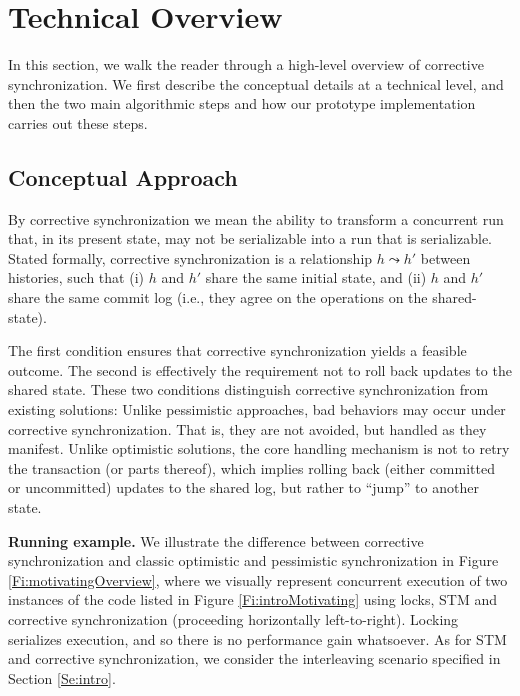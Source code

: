 \section{Technical Overview}

In this section, we walk the reader through a high-level overview of corrective synchronization. We first describe the conceptual details at a technical level, and then the two main algorithmic steps and how our prototype implementation carries out these steps.

\subsection{Conceptual Approach}

By corrective synchronization we mean the ability to transform a concurrent run that, in its present state, may not be serializable into a run that is serializable. Stated formally, corrective synchronization is a relationship $h \leadsto h'$ between histories, such that (i) $h$ and $h'$ share the same initial state, and (ii) $h$ and $h'$ share the same commit log (i.e., they agree on the operations on the shared-state).

The first condition ensures that corrective synchronization yields a feasible outcome. The second is effectively the requirement not to roll back updates to the shared state. These two conditions distinguish corrective synchronization from existing solutions: Unlike pessimistic approaches, bad behaviors may occur under corrective synchronization. That is, they are not avoided, but handled as they manifest. Unlike optimistic solutions, the core handling mechanism is not to retry the transaction (or parts thereof), which implies rolling back (either committed or uncommitted) updates to the shared log, but rather to ``jump'' to another state.

\noindent \textbf{Running example.}
We illustrate the difference between corrective synchronization and classic optimistic and pessimistic synchronization in Figure \ref{Fi:motivatingOverview}, where we visually represent concurrent execution of two instances of the code listed in Figure \ref{Fi:introMotivating} using locks, STM and corrective synchronization (proceeding horizontally left-to-right). Locking serializes execution, and so there is no performance gain whatsoever. As for STM and corrective synchronization, we consider the interleaving scenario specified in Section \ref{Se:intro}. %

